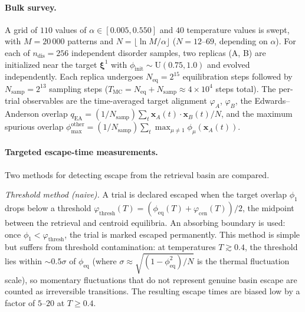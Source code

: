 \documentclass[11pt]{article}
\newcommand{\bxi}{\boldsymbol{\xi}}
\newcommand{\bx}{\mathbf{x}}
\begin{document}
\paragraph{Bulk survey.}  A grid of $110$ values of $\alpha \in [0.005, 0.550]$ and $40$ temperature values is swept, with $M = 20\,000$ patterns and $N = \lfloor\ln M/\alpha\rfloor$ ($N = 12$--$69$, depending on $\alpha$).  For each of $n_{\mathrm{dis}} = 256$ independent disorder samples, two replicas (A, B) are initialized near the target $\bxi^1$ with $\phi_{\mathrm{init}} \sim \mathrm{U}(0.75, 1.0)$ and evolved independently.  Each replica undergoes $N_{\mathrm{eq}} = 2^{15}$ equilibration steps followed by $N_{\mathrm{samp}} = 2^{13}$ sampling steps ($T_{\mathrm{MC}} = N_{\mathrm{eq}} + N_{\mathrm{samp}} \approx 4 \times 10^4$ steps total).  The per-trial observables are the time-averaged target alignment $\varphi_A$, $\varphi_B$, the Edwards--Anderson overlap $q_{\mathrm{EA}} = (1/N_{\mathrm{samp}})\sum_t \bx_A(t)\!\cdot\!\bx_B(t)/N$, and the maximum spurious overlap $\phi_{\max}^{\mathrm{other}} = (1/N_{\mathrm{samp}})\sum_t \max_{\mu\neq 1}\phi_\mu(\bx_A(t))$.

\paragraph{Targeted escape-time measurements.}
Two methods for detecting escape from the retrieval basin are compared.

\emph{Threshold method (naive).}
A trial is declared escaped when the target overlap $\phi_1$ drops below a threshold $\varphi_{\mathrm{thresh}}(T) = (\phi_{\mathrm{eq}}(T) + \varphi_{\mathrm{cen}}(T))/2$, the midpoint between the retrieval and centroid equilibria.  An absorbing boundary is used: once $\phi_1 < \varphi_{\mathrm{thresh}}$, the trial is marked escaped permanently.  This method is simple but suffers from threshold contamination: at temperatures $T \gtrsim 0.4$, the threshold lies within $\sim 0.5\sigma$ of $\phi_{\mathrm{eq}}$ (where $\sigma \approx \sqrt{(1-\phi_{\mathrm{eq}}^2)/N}$ is the thermal fluctuation scale), so momentary fluctuations that do not represent genuine basin escape are counted as irreversible transitions.  The resulting escape times are biased low by a factor of $5$--$20$ at $T \geq 0.4$.
\end{document}
